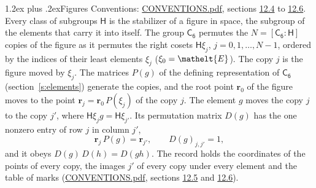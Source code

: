 \documentclass[10pt,a4paper]{article}
\makeatletter
\renewcommand\section{\@startsection{section}{1}{\z@}{-3ex plus -1ex minus -.2ex}%
  {1.2ex plus .2ex}{\normalfont\large\sffamily\bfseries\color{parttitle}}}
\numberwithin{equation}{section}
\newcommand{\eltfont}[1]{{\let\sigma\eltsigma\mathelt{#1}}}
\newcommand{\grp}[1]{\mathsf{#1}}
\newcommand{\cls}[1]{\eltfont{#1}}
\newcommand{\pointr}{\mathbf{r}}
\makeatother
\begin{document}
\section{Figures}\label{s:permutation}
Conventions: \href{../../CONVENTIONS.pdf}{CONVENTIONS.pdf}, sections \href{../../CONVENTIONS.pdf\#conv.12.4}{12.4} to \href{../../CONVENTIONS.pdf\#conv.12.6}{12.6}.
Every class of subgroups $\grp{H}$ is the stabilizer of a figure in space, the subgroup of the elements that carry it into itself. \label{n:local.orbit.size}\label{n:element.coset.least}\label{n:index.coset}The group $\grp{C_{6}}$ permutes the $N = [\grp{C_{6}} : \grp{H}]$ copies of the figure as it permutes the right cosets $\grp{H}\xi_j$, $j = 0, 1, \dots, N - 1$, ordered by the indices of their least elements $\xi_j$ ($\xi_0 = \cls{E}$). The copy $j$ is the figure moved by $\xi_j$. The matrices $P(g)$ of the defining representation of $\grp{C_{6}}$ (section~\ref{s:elements}) generate the copies, and the root point $\pointr_0$ of the figure moves to the point $\pointr_j = \pointr_0\, P(\xi_j)$ of the copy $j$. \label{n:local.coset.image}The element $g$ moves the copy $j$ to the copy $j'$, where $\grp{H}\xi_j g = \grp{H}\xi_{j'}$. \label{n:local.matrix.permutation}Its permutation matrix $D(g)$ has the one nonzero entry of row $j$ in column $j'$,
\begin{equation}\label{e:perm.matrix}\pointr_j\, P(g) = \pointr_{j'}, \qquad D(g)_{j,j'} = 1,\end{equation}
and it obeys $D(g)\, D(h) = D(gh)$. The record holds the coordinates of the points of every copy, the images $j'$ of every copy under every element and the table of marks (\href{../../CONVENTIONS.pdf}{CONVENTIONS.pdf}, sections \href{../../CONVENTIONS.pdf\#conv.12.5}{12.5} and \href{../../CONVENTIONS.pdf\#conv.12.6}{12.6}).
\end{document}
